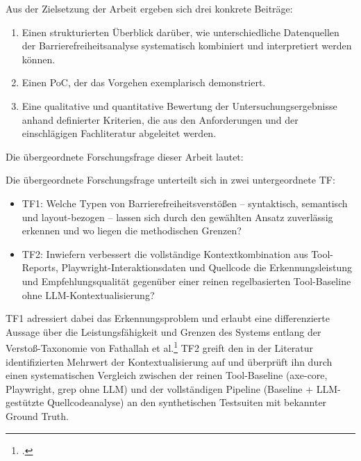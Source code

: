 
Aus der Zielsetzung der Arbeit ergeben sich drei konkrete Beiträge:

\begin{enumerate}
    \item Einen strukturierten Überblick darüber, wie unterschiedliche Datenquellen der Barrierefreiheitsanalyse systematisch kombiniert und interpretiert werden können.
    \item Einen \acf{PoC}, der das Vorgehen exemplarisch demonstriert.
    \item Eine qualitative und quantitative Bewertung der Untersuchungsergebnisse anhand definierter Kriterien, die aus den Anforderungen und der einschlägigen Fachliteratur abgeleitet werden.
\end{enumerate}

Die übergeordnete Forschungsfrage dieser Arbeit lautet:


Die übergeordnete Forschungsfrage unterteilt sich in zwei untergeordnete \ac{TF}:
\begin{itemize}
    \item \acs{TF}1: Welche Typen von Barrierefreiheitsverstößen -- syntaktisch, semantisch und layout-bezogen -- lassen sich durch den gewählten Ansatz zuverlässig erkennen und wo liegen die methodischen Grenzen?
    \item \acs{TF}2: Inwiefern verbessert die vollständige Kontextkombination aus Tool-Reports, Playwright-Interaktionsdaten und Quellcode die Erkennungsleistung und Empfehlungs\-qualität gegenüber einer reinen regelbasierten Tool-Baseline ohne \ac{LLM}-Kontextualisierung?
\end{itemize}

\acs{TF}1 adressiert dabei das Erkennungsproblem und erlaubt eine differenzierte Aussage über die Leistungsfähigkeit und Grenzen des Systems entlang der Verstoß-Taxonomie von Fathallah et al.\footcite[Vgl.][S. 114--115]{fathallah_accessguru_2025} \acs{TF}2 greift den in der Literatur identifizierten Mehrwert der Kontextualisierung auf und überprüft ihn durch einen systematischen Vergleich zwischen der reinen Tool-Baseline (axe-core, Playwright, grep ohne \ac{LLM}) und der vollständigen Pipeline (Baseline + \ac{LLM}-gestützte Quellcodeanalyse) an den synthetischen Testsuiten mit bekannter Ground Truth.

